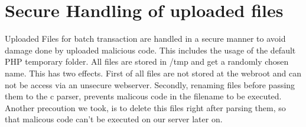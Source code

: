 \section{Secure Handling of uploaded files}
Uploaded Files for batch transaction are handled in a secure manner to avoid damage done by uploaded malicious code. This includes the usage of the default PHP temporary folder. All files are stored in /tmp and get a randomly chosen name. This has two effects. First of all files are not stored at the webroot and can not be access via an unsecure webserver. Secondly, renaming files before passing them to the c parser, prevents malicous code in the filename to be executed.
\newline
Another precoution we took, is to delete this files right after parsing them, so that malicous code can't be executed on our server later on. 


